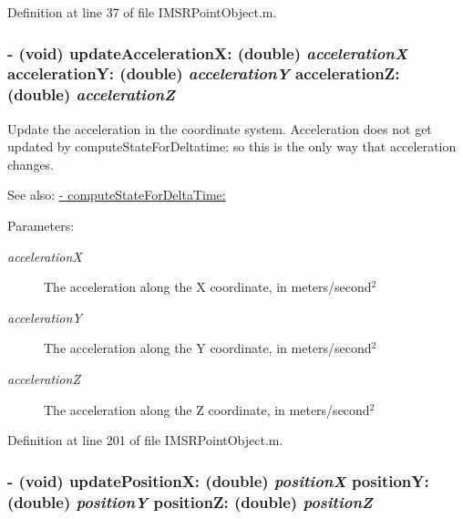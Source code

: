 Definition at line 37 of file IMSRPointObject.m.\hypertarget{interface_i_m_s_r_point_object_1a32028d39d5f3e7fd976cac12040a54}{
\subsubsection[{updateAccelerationX:accelerationY:accelerationZ:}]{\setlength{\rightskip}{0pt plus 5cm}- (void) updateAccelerationX: (double) {\em accelerationX}\/ accelerationY: (double) {\em accelerationY}\/ accelerationZ: (double) {\em accelerationZ}}}
\label{interface_i_m_s_r_point_object_1a32028d39d5f3e7fd976cac12040a54}


Update the acceleration in the coordinate system. Acceleration does not get updated by computeStateForDeltatime: so this is the only way that acceleration changes.

\begin{Desc}
\item[See also:]\hyperlink{interface_i_m_s_r_point_object_ae14396d83b2edd2f34b0bfb0f35a501}{- computeStateForDeltaTime:}\end{Desc}
\begin{Desc}
\item[Parameters:]
\begin{description}
\item[{\em accelerationX}]The acceleration along the X coordinate, in meters/second$^{\mbox{2}}$  \item[{\em accelerationY}]The acceleration along the Y coordinate, in meters/second$^{\mbox{2}}$  \item[{\em accelerationZ}]The acceleration along the Z coordinate, in meters/second$^{\mbox{2}}$  \end{description}
\end{Desc}


Definition at line 201 of file IMSRPointObject.m.\hypertarget{interface_i_m_s_r_point_object_151a5fa0c67135b90a0de70b061276c3}{
\subsubsection[{updatePositionX:positionY:positionZ:}]{\setlength{\rightskip}{0pt plus 5cm}- (void) updatePositionX: (double) {\em positionX}\/ positionY: (double) {\em positionY}\/ positionZ: (double) {\em positionZ}}}
\label{interface_i_m_s_r_point_object_151a5fa0c67135b90a0de70b061276c3}


